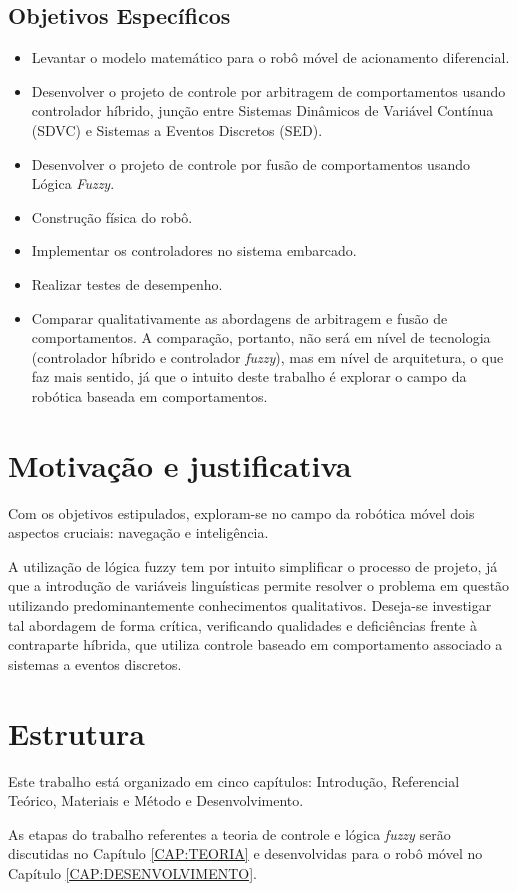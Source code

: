 	\subsection{Objetivos Específicos}
 
	\begin{itemize}
	  \item Levantar o modelo matemático para o robô móvel de acionamento
	  diferencial.
	  \item Desenvolver o projeto de controle por arbitragem de comportamentos usando
	  controlador híbrido, junção entre Sistemas Dinâmicos de Variável 
	  Contínua (SDVC) e Sistemas a Eventos Discretos (SED).
	  \item Desenvolver o projeto de controle por fusão de comportamentos usando Lógica 
	  \textit{Fuzzy}.
	  \item Construção física do robô. 
	  \item Implementar os controladores no sistema embarcado. 
	  \item Realizar testes de desempenho.
	  \item Comparar qualitativamente as abordagens de arbitragem e fusão de comportamentos. A 
	comparação, portanto, não será em nível de tecnologia (controlador híbrido e controlador
	\textit{fuzzy}), mas em nível de arquitetura, o que faz mais sentido, já que o intuito deste
	trabalho é explorar o campo da robótica baseada em comportamentos. 
	\end{itemize}
	
\section{Motivação e justificativa}


Com os objetivos estipulados, exploram-se no campo da robótica móvel dois 
aspectos cruciais: navegação e inteligência.

A utilização de lógica fuzzy tem por intuito simplificar o processo de
projeto, já que a introdução de variáveis linguísticas permite
resolver o problema em questão utilizando predominantemente conhecimentos
qualitativos. Deseja-se investigar tal abordagem de forma crítica, verificando
qualidades e deficiências frente à contraparte híbrida, que utiliza controle
baseado em comportamento associado a sistemas a eventos discretos.

\section{Estrutura}

Este trabalho está organizado em cinco capítulos: Introdução,
Referencial Teórico, Materiais e Método e Desenvolvimento. 

As etapas do trabalho referentes a teoria de controle e lógica \textit{fuzzy}
serão discutidas no Capítulo \ref{CAP:TEORIA} e desenvolvidas para o robô móvel 
no Capítulo \ref{CAP:DESENVOLVIMENTO}.
